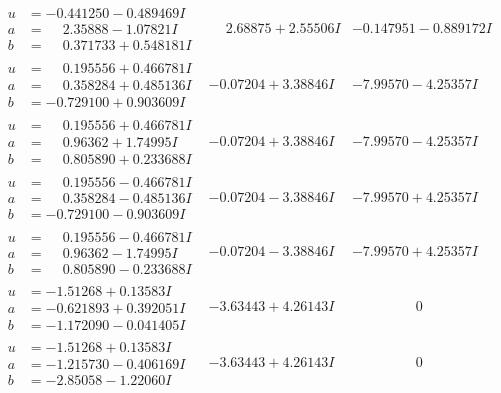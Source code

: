 \documentclass[1p]{elsarticle_modified}
\theoremstyle{definition}
\begin{document}
$$\begin{array}{c|c|c}
\begin{aligned}
u &= -0.441250 - 0.489469 I \\
a &= \phantom{-}2.35888 - 1.07821 I \\
b &= \phantom{-}0.371733 + 0.548181 I\end{aligned}
 & \phantom{-}2.68875 + 2.55506 I & -0.147951 - 0.889172 I \\ \hline\begin{aligned}
u &= \phantom{-}0.195556 + 0.466781 I \\
a &= \phantom{-}0.358284 + 0.485136 I \\
b &= -0.729100 + 0.903609 I\end{aligned}
 & -0.07204 + 3.38846 I & -7.99570 - 4.25357 I \\ \hline\begin{aligned}
u &= \phantom{-}0.195556 + 0.466781 I \\
a &= \phantom{-}0.96362 + 1.74995 I \\
b &= \phantom{-}0.805890 + 0.233688 I\end{aligned}
 & -0.07204 + 3.38846 I & -7.99570 - 4.25357 I \\ \hline\begin{aligned}
u &= \phantom{-}0.195556 - 0.466781 I \\
a &= \phantom{-}0.358284 - 0.485136 I \\
b &= -0.729100 - 0.903609 I\end{aligned}
 & -0.07204 - 3.38846 I & -7.99570 + 4.25357 I \\ \hline\begin{aligned}
u &= \phantom{-}0.195556 - 0.466781 I \\
a &= \phantom{-}0.96362 - 1.74995 I \\
b &= \phantom{-}0.805890 - 0.233688 I\end{aligned}
 & -0.07204 - 3.38846 I & -7.99570 + 4.25357 I \\ \hline\begin{aligned}
u &= -1.51268 + 0.13583 I \\
a &= -0.621893 + 0.392051 I \\
b &= -1.172090 - 0.041405 I\end{aligned}
 & -3.63443 + 4.26143 I & \phantom{-0.000000 } 0 \\ \hline\begin{aligned}
u &= -1.51268 + 0.13583 I \\
a &= -1.215730 - 0.406169 I \\
b &= -2.85058 - 1.22060 I\end{aligned}
 & -3.63443 + 4.26143 I & \phantom{-0.000000 } 0 \\ \hline\begin{aligned}

\end{aligned}
\end{array}$$
\end{document}
